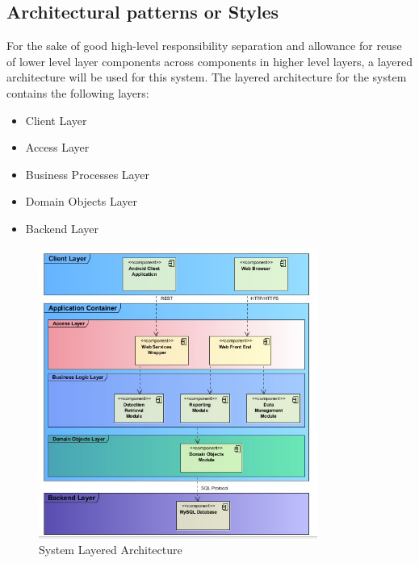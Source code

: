 \documentclass[12pt]{article}
\begin{document}
                	\subsection{Architectural patterns or Styles}
                			For the sake of good high-level responsibility separation and allowance for reuse of lower level layer components across components in higher level layers, a layered architecture will be used for this system.
                			The layered architecture for the system contains the following layers:
                			\begin{itemize}
		                			\item Client Layer
		                			\item Access Layer
		                			\item Business Processes Layer
		                			\item Domain Objects Layer
		                			\item Backend Layer
                			\end{itemize} 
                			
                			
                			\begin{figure}[h]
                                   \centering
                                   \includegraphics[width=3.59in, height=3.75in]{Pictures/SystemArchitectureLayers.jpg}
                                   \caption{System Layered Architecture}
        					\end{figure}
        					\FloatBarrier
                			
\end{document}
